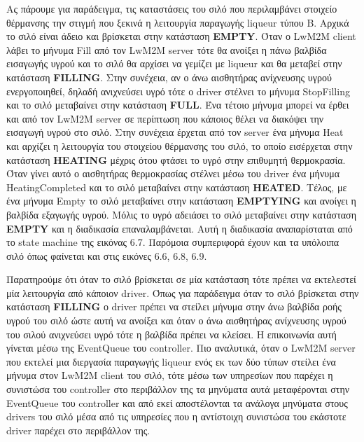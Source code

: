 Ας πάρουμε για παράδειγμα, τις καταστάσεις του σιλό που περιλαμβάνει στοιχείο θέρμανσης την στιγμή που ξεκινά η λειτουργία παραγωγής liqueur τύπου Β. Αρχικά το σιλό είναι άδειο και βρίσκεται στην κατάσταση \textbf{EMPTY}. Όταν ο LwM2M client λάβει το μήνυμα Fill από τον LwM2M server τότε θα ανοίξει η πάνω βαλβίδα εισαγωγής υγρού και το σιλό θα αρχίσει να γεμίζει με liqueur και θα μεταβεί στην κατάσταση \textbf{FILLING}. Στην συνέχεια, αν ο άνω αισθητήρας ανίχνευσης υγρού ενεργοποιηθεί, δηλαδή ανιχνεύσει υγρό τότε ο driver στέλνει το μήνυμα StopFilling και το σιλό μεταβαίνει στην κατάσταση \textbf{FULL}. Ένα τέτοιο μήνυμα μπορεί να έρθει και από τον LwM2M server σε περίπτωση που κάποιος θέλει να διακόψει την εισαγωγή υγρού στο σιλό. Στην συνέχεια έρχεται από τον server ένα μήνυμα Heat και αρχίζει η λειτουργία του στοιχείου θέρμανσης του σιλό, το οποίο εισέρχεται στην κατάσταση \textbf{HEATING} μέχρις ότου φτάσει το υγρό στην επιθυμητή θερμοκρασία. Όταν γίνει αυτό ο αισθητήρας θερμοκρασίας στέλνει μέσω του driver ένα μήνυμα HeatingCompleted και το σιλό μεταβαίνει στην κατάσταση \textbf{HEATED}. Τέλος, με ένα μήνυμα Empty το σιλό μεταβαίνει στην κατάσταση \textbf{EMPTYING} και ανοίγει η βαλβίδα εξαγωγής υγρού. Μόλις το υγρό αδειάσει το σιλό μεταβαίνει στην κατάσταση \textbf{EMPTY} και η διαδικασία επαναλαμβάνεται. Αυτή η διαδικασία αναπαρίσταται από το state machine της εικόνας 6.7. Παρόμοια συμπεριφορά έχουν και τα υπόλοιπα σιλό όπως φαίνεται και στις εικόνες 6.6, 6.8, 6.9.


 Παρατηρούμε ότι όταν το σιλό βρίσκεται σε μία κατάσταση τότε πρέπει να εκτελεστεί μία λειτουργία από κάποιον driver. Όπως για παράδειγμα όταν το σιλό βρίσκεται στην κατάσταση \textbf{FILLING} ο driver πρέπει να στείλει μήνυμα στην άνω βαλβίδα ροής υγρού του σιλό ώστε αυτή να ανοίξει και όταν ο άνω αισθητήρας ανίχνευσης υγρού του σιλού ανιχνεύσει υγρό τότε η βαλβίδα πρέπει να κλείσει. Η επικοινωνία αυτή γίνεται μέσω της EventQueue του controller. Πιο αναλυτικά, όταν ο LwM2M  server που εκτελεί μια διεργασία παραγωγής liqueur ενός εκ των δύο τύπων στείλει ένα μήνυμα στον  LwM2M client του σιλό, τότε μέσω των υπηρεσίων που παρέχει η συνιστώσα του controller στο περιβάλλον της τα μηνύματα αυτά μεταφέρονται στην EventQueue του controller και από εκεί αποστέλονται τα ανάλογα μηνύματα στους drivers του σιλό μέσα από τις υπηρεσίες που η αντίστοιχη συνιστώσα του εκάστοτε driver παρέχει στο περιβάλλον της. 


